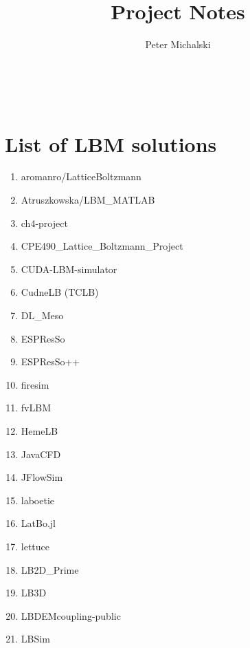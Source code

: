 \documentclass{article}
\title{Project Notes}
\author{Peter Michalski}
\date{}
\begin{document}
\maketitle

~\newpage


\section{List of LBM solutions}
\begin{enumerate}
	\item aromanro/LatticeBoltzmann 
	
	\item Atruszkowska/LBM\_MATLAB 
	
	\item ch4-project  
	
	\item CPE490\_Lattice\_Boltzmann\_Project 
	
	\item CUDA-LBM-simulator 
	
	\item CudneLB (TCLB) 
	
	\item DL\_Meso 
	
	\item ESPResSo 
	
	\item ESPResSo++ 
	
	\item firesim  
	
	\item fvLBM 
	
	\item HemeLB 
	
	\item JavaCFD 
	
	\item JFlowSim 
	
	\item laboetie 
	
	\item LatBo.jl 
	
	\item lettuce 
	
	\item LB2D\_Prime 
	
	\item LB3D  
	
	\item LBDEMcoupling-public 
	
	\item LBSim 
	

\end{enumerate}
\end{document}
